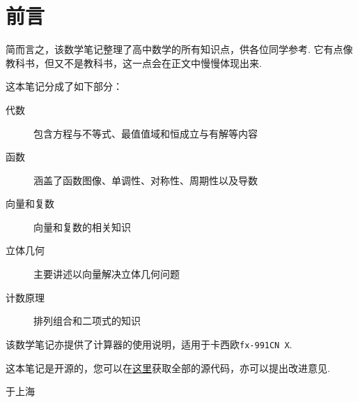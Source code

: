 \section*{前言}
简而言之，该数学笔记整理了高中数学的所有知识点，供各位同学参考. 它有点像教科书，但又不是教科书，这一点会在正文中慢慢体现出来.

这本笔记分成了如下部分：

\begin{description}
	\item[代数] 包含方程与不等式、最值值域和恒成立与有解等内容
	\item[函数] 涵盖了函数图像、单调性、对称性、周期性以及导数
	\item[向量和复数] 向量和复数的相关知识
	\item[立体几何] 主要讲述以向量解决立体几何问题
	\item[计数原理] 排列组合和二项式的知识
\end{description}

该数学笔记亦提供了计算器的使用说明，适用于卡西欧\verb|fx-991CN X|.

这本笔记是开源的，您可以在\href{https://github.com/jason-bowen-zheng/math-notes}{这里}获取全部的源代码，亦可以提出改进意见.
\hypersetup{hidelinks}

\begin{flushright}
	\date{2022年11月}于上海
\end{flushright}
